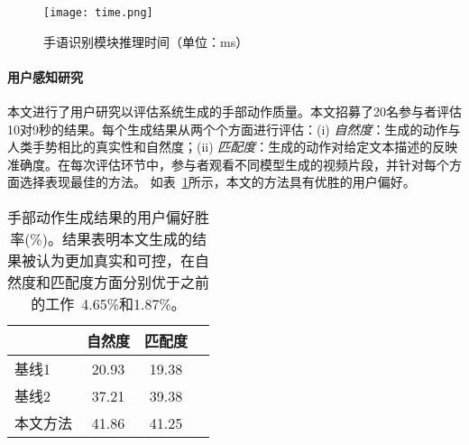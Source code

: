 \begin{figure}
  \centering
  \texttt{[image: time.png]}
  \caption{手语识别模块推理时间（单位：ms）}
  \label{fig:time}
\end{figure}


\paragraph{用户感知研究}
本文进行了用户研究以评估系统生成的手部动作质量。本文招募了20名参与者评估10对9秒的结果。每个生成结果从两个个方面进行评估：(i) \textit{自然度}：生成的动作与人类手势相比的真实性和自然度；(ii) \textit{匹配度}：生成的动作对给定文本描述的反映准确度。在每次评估环节中，参与者观看不同模型生成的视频片段，并针对每个方面选择表现最佳的方法。
如表~\ref{tab:perceptual_study}所示，本文的方法具有优胜的用户偏好。

\begin{table}[t]
    \centering
    \caption{手部动作生成结果的用户偏好胜率(\%)。结果表明本文生成的结果被认为更加真实和可控，在自然度和匹配度方面分别优于之前的工作~\cite{chen2024syntalker}4.65\%和1.87\%。}
    \small
    \label{tab:perceptual_study}
    \begin{tabular}{l ccc}
    \toprule
    & 自然度 & 匹配度 \\
    \midrule
    基线1~\cite{yang2024freetalker} & 20.93  & 19.38 \\
    基线2~\cite{chen2024syntalker} & 37.21  & 39.38 \\
    本文方法 & 41.86  & 41.25 \\
    \bottomrule
    \end{tabular}
\end{table}

    
    

